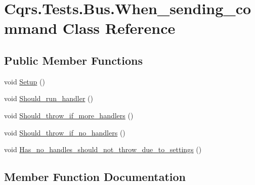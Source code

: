 \hypertarget{classCqrs_1_1Tests_1_1Bus_1_1When__sending__command}{}\section{Cqrs.\+Tests.\+Bus.\+When\+\_\+sending\+\_\+command Class Reference}
\label{classCqrs_1_1Tests_1_1Bus_1_1When__sending__command}
\subsection*{Public Member Functions}
\begin{DoxyCompactItemize}
\item 
void \hyperlink{classCqrs_1_1Tests_1_1Bus_1_1When__sending__command_a37384a49eaa87a6bfb59d6380ac98813}{Setup} ()
\item 
void \hyperlink{classCqrs_1_1Tests_1_1Bus_1_1When__sending__command_a34f4ae1af0eb0e4af591e626bd29f6ff}{Should\+\_\+run\+\_\+handler} ()
\item 
void \hyperlink{classCqrs_1_1Tests_1_1Bus_1_1When__sending__command_aab1c48d45286be5d780572b207378ef4}{Should\+\_\+throw\+\_\+if\+\_\+more\+\_\+handlers} ()
\item 
void \hyperlink{classCqrs_1_1Tests_1_1Bus_1_1When__sending__command_af61edb6741b37c219bbc3fe3d5cf1e1c}{Should\+\_\+throw\+\_\+if\+\_\+no\+\_\+handlers} ()
\item 
void \hyperlink{classCqrs_1_1Tests_1_1Bus_1_1When__sending__command_ad2854163c287e27028ba21a9d273d43e}{Has\+\_\+no\+\_\+handles\+\_\+should\+\_\+not\+\_\+throw\+\_\+due\+\_\+to\+\_\+settings} ()
\end{DoxyCompactItemize}


\subsection{Member Function Documentation}
\mbox{\label{classCqrs_1_1Tests_1_1Bus_1_1When__sending__command_ad2854163c287e27028ba21a9d273d43e}} 
